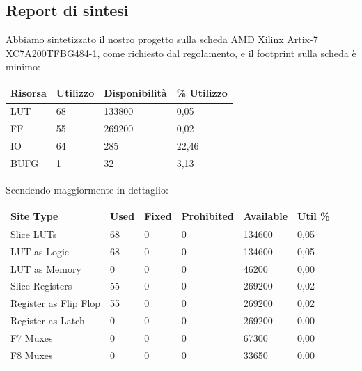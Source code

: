 \documentclass[a4paper]{article}
\begin{document}
\subsection{Report di sintesi}
Abbiamo sintetizzato il nostro progetto sulla scheda AMD Xilinx Artix-7 XC7A200TFBG484-1, come richiesto dal regolamento, e il footprint sulla scheda è minimo:

\begin{table}[H]
\centering
\begin{tabular}{|l|l|l|l|}
\hline
\textbf{Risorsa} & \textbf{Utilizzo} & \textbf{Disponibilità} & \textbf{\% Utilizzo} \\ \hline
LUT              & 68                & 133800                 & 0,05                 \\ \hline
FF               & 55                & 269200                 & 0,02                 \\ \hline
IO               & 64                & 285                    & 22,46                \\ \hline
BUFG             & 1                 & 32                     & 3,13                 \\ \hline
\end{tabular}
\end{table}

Scendendo maggiormente in dettaglio:

\begin{table}[H]
\centering
\begin{tabular}{|l|l|l|l|l|l|}
\hline
\textbf{Site Type}    & \textbf{Used} & \textbf{Fixed} & \textbf{Prohibited} & \textbf{Available} & \textbf{Util \%} \\ \hline
Slice LUTs            & 68            & 0              & 0                   & 134600             & 0,05           \\ \hline
LUT as Logic          & 68            & 0              & 0                   & 134600             & 0,05           \\ \hline
LUT as Memory         & 0             & 0              & 0                   & 46200              & 0,00           \\ \hline
Slice Registers       & 55            & 0              & 0                   & 269200             & 0,02           \\ \hline
Register as Flip Flop & 55            & 0              & 0                   & 269200             & 0,02           \\ \hline
Register as Latch     & 0             & 0              & 0                   & 269200             & 0,00           \\ \hline
F7 Muxes              & 0             & 0              & 0                   & 67300              & 0,00           \\ \hline
F8 Muxes              & 0             & 0              & 0                   & 33650              & 0,00           \\ \hline
\end{tabular}
\end{table}
\end{document}
